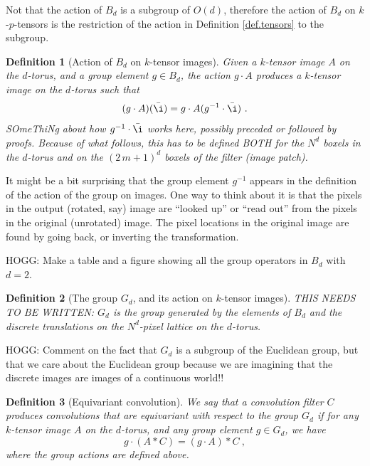 \documentclass{article}
\theoremstyle{plain}
\newtheorem{definition}{Definition}
\begin{document}
Not that the action of $B_d$ is a subgroup of $O(d)$, therefore the action of $B_d$ on $k$-$p$-tensors is the restriction of the action in Definition \ref{def.tensors} to the subgroup.

\begin{definition}[Action of $B_d$ on $k$-tensor images]
Given a $k$-tensor image $A$ on the $d$-torus, and a group element $g\in B_d$, the action $g\cdot A$ produces a $k$-tensor image on the $d$-torus such that
\begin{equation}
    (g\cdot A)(\bar\i) = g\cdot A({g^{-1}\cdot \bar\i}) ~.
\end{equation}
SOmeThiNg about how $g^{-1}\cdot\bar\i$ works here, possibly preceded or followed by proofs. Because of what follows, this has to be defined BOTH for the $N^d$ boxels in the $d$-torus and on the $(2\,m+1)^d$ boxels of the filter (image patch).
\end{definition}

It might be a bit surprising that the group element $g^{-1}$ appears in the definition of the action of the group on images.
One way to think about it is that the pixels in the output (rotated, say) image are ``looked up'' or ``read out'' from the pixels in the original (unrotated) image.
The pixel locations in the original image are found by going back, or inverting the transformation.

HOGG: Make a table and a figure showing all the group operators in $B_d$ with $d=2$.

\begin{definition}[The group $G_d$, and its action on $k$-tensor images]
THIS NEEDS TO BE WRITTEN: $G_d$ is the group generated by the elements of $B_d$ and the discrete translations on the $N^d$-pixel lattice on the $d$-torus.
\end{definition}

HOGG: Comment on the fact that $G_d$ is a subgroup of the Euclidean group, but that we care about the Euclidean group because we are imagining that the discrete images are images of a continuous world!!

\begin{definition}[Equivariant convolution]
We say that a convolution filter $C$ produces convolutions that are equivariant with respect to the group $G_d$ if for any $k$-tensor image $A$ on the $d$-torus, and any group element $g\in G_d$, we have
\begin{equation}
    g\cdot (A\ast C) = (g\cdot A)\ast C ~,
\end{equation}
where the group actions are defined above.
\end{definition}
\end{document}
